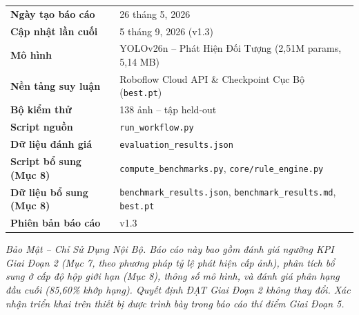 \documentclass[12pt, a4paper]{article}
\begin{document}
\begin{tabular}{L{5cm} L{8.5cm}}
  \textbf{Ngày tạo báo cáo}    & 26 tháng 5, 2026 \\
  \textbf{Cập nhật lần cuối}    & 5 tháng 9, 2026 (v1.3) \\
  \textbf{Mô hình}             & YOLOv26n -- Phát Hiện Đối Tượng (2,51M params, 5,14 MB) \\
  \textbf{Nền tảng suy luận}   & Roboflow Cloud API \& Checkpoint Cục Bộ (\texttt{best.pt}) \\
  \textbf{Bộ kiểm thử}         & 138 ảnh -- tập held-out \\
  \textbf{Script nguồn}        & \texttt{run\_workflow.py} \\
  \textbf{Dữ liệu đánh giá}    & \texttt{evaluation\_results.json} \\
  \textbf{Script bổ sung (Mục 8)} & \texttt{compute\_benchmarks.py}, \texttt{core/rule\_engine.py} \\
  \textbf{Dữ liệu bổ sung (Mục 8)} & \texttt{benchmark\_results.json}, \texttt{benchmark\_results.md}, \texttt{best.pt} \\
  \textbf{Phiên bản báo cáo}   & v1.3 \\
\end{tabular}

\vspace{1cm}
{\small\color{darkgray}\textit{Bảo Mật -- Chỉ Sử Dụng Nội Bộ. Báo cáo này bao gồm đánh giá ngưỡng KPI Giai Đoạn 2 (Mục 7, theo phương pháp tỷ lệ phát hiện cấp ảnh), phân tích bổ sung ở cấp độ hộp giới hạn (Mục 8), thông số mô hình, và đánh giá phân hạng đầu cuối (85,60\% khớp hạng). Quyết định ĐẠT Giai Đoạn 2 không thay đổi. Xác nhận triển khai trên thiết bị được trình bày trong báo cáo thí điểm Giai Đoạn 5.}}
\end{document}
